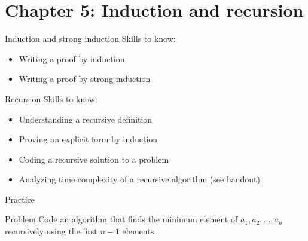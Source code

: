 \documentclass[dvipsnames,t]{beamer}
\begin{document}
\section{Chapter 5: Induction and recursion}
\begin{frame}{Induction and strong induction}
Skills to know:
\begin{itemize}
    \item Writing a proof by induction
    \item Writing a proof by strong induction
\end{itemize}
\end{frame}

\begin{frame}{Recursion}
Skills to know:
\begin{itemize}
    \item Understanding a recursive definition
    \item Proving an explicit form by induction
    \item Coding a recursive solution to a problem
    \item Analyzing time complexity of a recursive algorithm (see handout)
\end{itemize}
\end{frame}


\begin{frame}{Practice}
\begin{block}{Problem}
Code an algorithm  that finds the minimum element of $a_1,a_2,\dots,a_n$ recursively using the first $n-1$ elements.
\end{block}
\end{frame}
\end{document}
